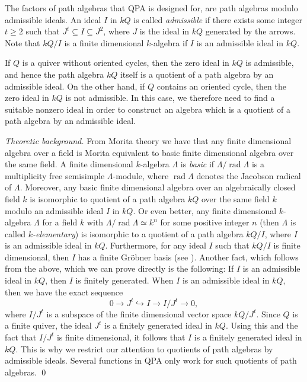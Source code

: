 \documentclass{amsart}
\newcommand{\rad}{\operatorname{rad}\nolimits}
\renewcommand{\L}{\Lambda}
\theoremstyle{definition}
\theoremstyle{theoretic}
\newenvironment{theoback}
{\medskip\small\textit{Theoretic background.} }
{\qed\par\medskip}
\begin{document}
The factors of path algebras that QPA is designed for, are path
algebras modulo admissible ideals.  An ideal $I$ in $kQ$ is called
\emph{admissible} if there exists some integer $t\geqslant 2$ such
that $J^t\subseteq I \subseteq J^2$, where $J$ is the ideal in $kQ$
generated by the arrows.  Note that $kQ/I$ is a finite dimensional
$k$-algebra if $I$ is an admissible ideal in $kQ$.

If $Q$ is a quiver without oriented cycles, then the zero ideal in
$kQ$ is admissible, and hence the path algebra $kQ$ itself is a
quotient of a path algebra by an admissible ideal.  On the other hand,
if $Q$ contains an oriented cycle, then the zero ideal in $kQ$ is not
admissible.  In this case, we therefore need to find a suitable
nonzero ideal in order to construct an algebra which is a quotient of
a path algebra by an admissible ideal.

\begin{theoback}
From Morita theory we have that
any finite dimensional algebra over a field is Morita equivalent to
basic finite dimensional algebra over the same field.  A finite
dimensional $k$-algebra $\L$ is \emph{basic} if $\L/\rad \L$ is a
multiplicity free semisimple $\L$-module, where $\rad \L$ denotes the
Jacobson radical of $\L$.  Moreover, any basic finite dimensional
algebra over an algebraically closed field $k$ is isomorphic to
quotient of a path algebra $kQ$ over the same field $k$ modulo an
admissible ideal $I$ in $kQ$.  Or even better, any finite dimensional
$k$-algebra $\L$ for a field $k$ with $\L/\rad\L\simeq k^n$ for some
positive integer $n$ (then $\L$ is called \emph{$k$-elementary}) is
isomorphic to a quotient of a path algebra $kQ/I$, where $I$ is an
admissible ideal in $kQ$.  Furthermore, for any ideal $I$ such that
$kQ/I$ is finite dimensional, then $I$ has a finite Gr\"obner basis
(see \cite{Green}).  Another fact, which follows from the above, which
we can prove directly is the following:  If $I$ is an admissible ideal
in $kQ$, then $I$ is finitely generated.  When $I$ is an admissible
ideal in $kQ$, then we have the exact sequence
\[0\to J^t\hookrightarrow I\to I/J^t\to 0,\] where $I/J^t$ is a
subspace of the finite dimensional vector space $kQ/J^t$.  Since $Q$
is a finite quiver, the ideal $J^t$ is a finitely generated ideal in
$kQ$.  Using this and the fact that $I/J^t$ is finite dimensional, it
follows that $I$ is a finitely generated ideal in $kQ$.  This is why
we restrict our attention to quotients of path algebras by admissible
ideals.  Several functions in QPA only work for such quotients of path
algebras.
\end{theoback}
\end{document}
